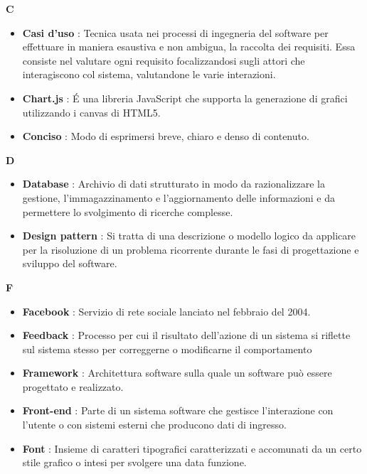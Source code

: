 \newpage
{\huge \textbf{C}}
\begin{flushleft}
\begin{itemize}[label={}]
\item \textbf{Casi d'uso} : Tecnica usata nei processi di ingegneria del software per effettuare in maniera esaustiva e non ambigua, la raccolta dei requisiti. Essa consiste nel valutare ogni requisito focalizzandosi sugli attori che interagiscono col sistema, valutandone le varie interazioni.
\item \textbf{Chart.js} : \'E una libreria JavaScript che supporta la generazione di grafici utilizzando i canvas di HTML5.
\item \textbf{Conciso} : Modo di esprimersi breve, chiaro e denso di contenuto.
\end{itemize}
\end{flushleft}
\newpage
{\huge \textbf{D}}
\begin{flushleft}
\begin{itemize}[label={}]
\item \textbf{Database} :  Archivio di dati strutturato in modo da razionalizzare la gestione, l'immagazzinamento e l'aggiornamento delle informazioni e da permettere lo svolgimento di ricerche complesse.
\item \textbf{Design pattern} : Si tratta di una descrizione o modello logico da applicare per la risoluzione di un problema ricorrente durante le fasi di progettazione e sviluppo del software.
\end{itemize}
\end{flushleft}
\newpage
{\huge \textbf{F}}
\begin{flushleft}
\begin{itemize}[label={}]
\item \textbf{Facebook} : Servizio di rete sociale lanciato nel febbraio del 2004.
\item \textbf{Feedback} : Processo per cui il risultato dell'azione di un sistema si riflette sul sistema stesso per correggerne o modificarne il comportamento
\item \textbf{Framework} : Architettura software sulla quale un software può essere progettato e realizzato.
\item \textbf{Front-end} : Parte di un sistema software che gestisce l'interazione con l'utente o con sistemi esterni che producono dati di ingresso.
\item \textbf{Font} : Insieme di caratteri tipografici caratterizzati e accomunati da un certo stile grafico o intesi per svolgere una data funzione.
\end{itemize}
\end{flushleft}
